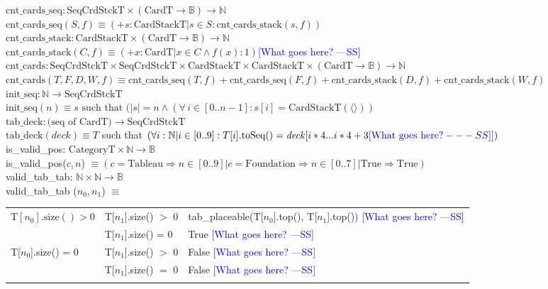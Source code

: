 \documentclass[12pt]{article}
\newcommand{\authornote}[3]{\textcolor{#1}{[#3 ---#2]}}
\newcommand{\authornote}[3]{}
\newcommand{\wss}[1]{\authornote{blue}{SS}{#1}}
\begin{document}
\noindent $\text{cnt\_cards\_seq}: \text{SeqCrdStckT} \times (\text{CardT}
\rightarrow \mathbb{B}) \rightarrow \mathbb{N}$\\
\noindent $\text{cnt\_cards\_seq}(S, f) \equiv (+ s: \text{CardStackT} | s \in S :
\text{cnt\_cards\_stack}(s, f))$\\

\noindent $\text{cnt\_cards\_stack}: \text{CardStackT} \times (\text{CardT}
\rightarrow \mathbb{B}) \rightarrow \mathbb{N}$\\
\noindent $\text{cnt\_cards\_stack}(C, f) \equiv (+x : \text{CardT} | x \in C \land f(x): 1) $\wss{What goes here?}\\

\noindent $\text{cnt\_cards}: \text{SeqCrdStckT} \times \text{SeqCrdStckT}
\times \text{CardStackT} \times \text{CardStackT} \times (\text{CardT}
\rightarrow \mathbb{B}) \rightarrow \mathbb{N}$\\
\noindent $\text{cnt\_cards}(T, F, D, W, f) \equiv \text{cnt\_cards\_seq}(T,
f) + \text{cnt\_cards\_seq}(F, f) + \text{cnt\_cards\_stack}(D, f) +
\text{cnt\_cards\_stack}(W, f)$\\

\noindent $\text{init\_seq}: \mathbb{N} \rightarrow \text{SeqCrdStckT}$\\
\noindent $\text{init\_seq}(n) \equiv s \text{ such that } (|s| = n \land (\forall\, i
\in [0..n-1] : s[i] = \text{CardStackT}(\langle \rangle))$\\

\noindent $\text{tab\_deck}: \text{(seq of CardT)} \rightarrow \text{SeqCrdStckT}$\\
\noindent $\text{tab\_deck} (\mathit{deck}) \equiv T$ such that
$(\forall i: \mathbb{N} | i \in [0..9] : T[i].\text{toSeq}() =
\mathit{deck}[i*4...i*4+3\wss{\text{What goes here?}}])$\\

\noindent is\_valid\_pos: $ \text{CategoryT} \times \mathbb{N} \rightarrow \mathbb{B}$\\
\noindent is\_valid\_pos($c, n$) $\equiv (c = \text{Tableau} \Rightarrow n \in
[0..9] | c = \text{Foundation} \Rightarrow n \in [0..7] | \text{True} \Rightarrow \text{True})$\\

\noindent valid\_tab\_tab: $\mathbb{N} \times \mathbb{N} \rightarrow \mathbb{B}$\\
\noindent valid\_tab\_tab ($n_0, n_1$) $\equiv$

\begin{tabular}{|p{4cm}|p{3.5cm}|l|}
\hhline{|-|-|-|}
$\text{T}[n_0].\text{size}() > 0$ & T[$n_1$].size() $>$ 0 & tab\_placeable(T[$n_0$].top(), T[$n_1$].top()) \wss{What goes here?}\\
\hhline{|~|-|-|}
 & T[$n_1$].size() = 0 & True \wss{What goes here?}\\
\hhline{|-|-|-|}
T[$n_0$].size() = 0 & T[$n_1$].size() $>$ 0 & False \wss{What goes here?}\\
\hhline{|~|-|-|}
& T[$n_1$].size() $=$ 0 & False \wss{What goes here?}\\
\hhline{|-|-|-|}
\end{tabular}\\\\
\end{document}
